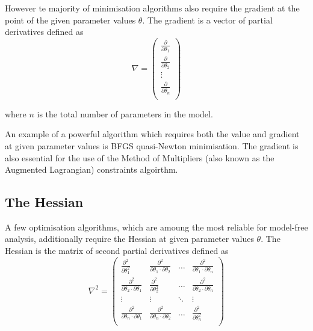 However te majority of minimisation algorithms also require the gradient at the point of the given parameter values $\theta$.  The gradient is a vector of partial derivatives defined as
\begin{equation}
 \nabla = \begin{pmatrix}
  \frac{\partial}{\partial \theta_1} \\
  \frac{\partial}{\partial \theta_2} \\
  \vdots \\
  \frac{\partial}{\partial \theta_n} \\
 \end{pmatrix}
\end{equation}

\noindent where $n$ is the total number of parameters in the model.

An example of a powerful algorithm which requires both the value and gradient at given parameter values is BFGS quasi-Newton minimisation.  The gradient is also essential for the use of the Method of Multipliers (also known as the Augmented Lagrangian) constraints algoirthm.


\subsection{The Hessian}

A few optimisation algorithms, which are amoung the most reliable for model-free analysis, additionally require the Hessian at given parameter values $\theta$.  The Hessian is the matrix of second partial derivatives defined as
\begin{equation}
 \nabla^2 = \begin{pmatrix}
  \frac{\partial^2}{\partial \theta_1^2}                       & \frac{\partial^2}{\partial \theta_1 \cdot \partial \theta_2}  & \ldots    & \frac{\partial^2}{\partial \theta_1 \cdot \partial \theta_n} \\
  \frac{\partial^2}{\partial \theta_2 \cdot \partial \theta_1} & \frac{\partial^2}{\partial \theta_2^2}                        & \ldots    & \frac{\partial^2}{\partial \theta_2 \cdot \partial \theta_n} \\
  \vdots                                                       & \vdots                                                        & \ddots    & \vdots \\
  \frac{\partial^2}{\partial \theta_n \cdot \partial \theta_1} & \frac{\partial^2}{\partial \theta_n \cdot \partial \theta_2}  & \ldots    & \frac{\partial^2}{\partial \theta_n^2} \\
 \end{pmatrix}
\end{equation}


